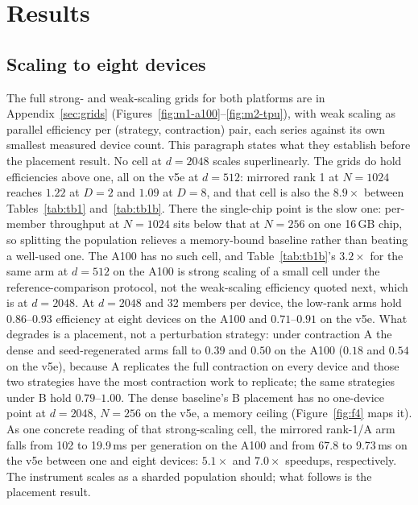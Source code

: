 \section{Results}
\label{sec:results}

\subsection{Scaling to eight devices}
The full strong- and weak-scaling grids for both platforms are in
Appendix~\ref{sec:grids} (Figures~\ref{fig:m1-a100}--\ref{fig:m2-tpu}),
with weak scaling as parallel efficiency per (strategy, contraction)
pair, each series against its own smallest measured device count. This
paragraph states what they establish before the placement result. No
cell at $d{=}2048$ scales superlinearly. The grids do
hold efficiencies above one, all on the v5e at $d{=}512$:
mirrored rank 1 at $N{=}1024$ reaches $1.22$
at $D{=}2$ and $1.09$ at $D{=}8$, and that cell is also the $8.9\times$
between Tables~\ref{tab:tb1} and~\ref{tab:tb1b}. There the single-chip
point is the slow one: per-member throughput at $N{=}1024$ sits below
that at $N{=}256$ on one 16\,GB chip, so splitting the population relieves
a memory-bound baseline rather than beating a well-used one. The A100
has no such cell, and Table~\ref{tab:tb1b}'s $3.2\times$ for the same arm
at $d{=}512$ on the A100 is strong scaling of a small cell under the
reference-comparison protocol, not the weak-scaling efficiency quoted
next, which is at $d{=}2048$. At $d{=}2048$ and 32 members per device,
the low-rank arms hold
$0.86$--$0.93$ efficiency at eight devices on the A100 and
$0.71$--$0.91$ on the v5e. What degrades is a placement, not a
perturbation strategy: under contraction A the dense and seed-regenerated
arms fall to $0.39$ and $0.50$ on the A100 ($0.18$ and $0.54$ on the
v5e), because A replicates the full contraction on every device and those
two strategies have the most contraction work to replicate; the same
strategies under B hold $0.79$--$1.00$. The dense baseline's B placement
has no one-device point at $d{=}2048$, $N{=}256$ on the v5e, a memory
ceiling (Figure~\ref{fig:f4} maps it). As one concrete reading of that
strong-scaling cell, the
mirrored rank-1/A arm falls from 102 to 19.9\,ms per generation on the A100
and from 67.8 to 9.73\,ms on the v5e between one and eight devices: $5.1\times$
and $7.0\times$ speedups, respectively. The instrument scales as a
sharded population should; what follows is the placement result.


